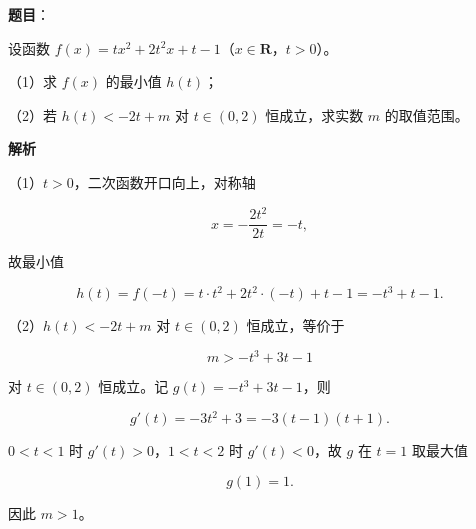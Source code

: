 \begin{answer}

\textbf{题目}：

设函数 $f(x)=tx^2+2t^2x+t-1$（$x\in\mathbf R$，$t>0$）。

（1）求 $f(x)$ 的最小值 $h(t)$；

（2）若 $h(t)<-2t+m$ 对 $t\in(0,2)$ 恒成立，求实数 $m$ 的取值范围。

\textbf{解析}

（1）$t>0$，二次函数开口向上，对称轴

\nopagebreak[4]
\[x=-\frac{2t^2}{2t}=-t,\]

故最小值

\nopagebreak[4]
\[h(t)=f(-t)=t\cdot t^2+2t^2\cdot(-t)+t-1=-t^3+t-1.\]

（2）$h(t)<-2t+m$ 对 $t\in(0,2)$ 恒成立，等价于

\nopagebreak[4]
\[m>-t^3+3t-1\]

对 $t\in(0,2)$ 恒成立。记 $g(t)=-t^3+3t-1$，则

\nopagebreak[4]
\[g'(t)=-3t^2+3=-3(t-1)(t+1).\]

$0<t<1$ 时 $g'(t)>0$，$1<t<2$ 时 $g'(t)<0$，故 $g$ 在 $t=1$ 取最大值

\nopagebreak[4]
\[g(1)=1.\]

因此 $m>1$。


\end{answer}
